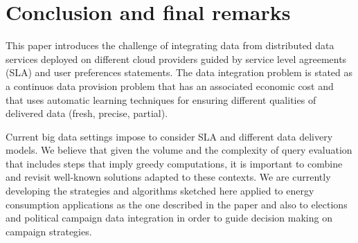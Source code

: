 \documentclass{llncs}
\begin{document}
\section{Conclusion and final remarks}\label{sec:conc}
This paper introduces the challenge of integrating data from distributed data services deployed on different cloud providers guided by service level agreements (SLA) and user preferences statements. The data integration problem is stated as a continuos data provision problem that has an associated economic cost and that uses automatic learning techniques for ensuring different qualities of delivered data (fresh, precise, partial).

Current big data settings impose to consider SLA and different data delivery models. We believe that given the volume and the complexity of query evaluation that includes steps that imply greedy computations, it is important to combine and revisit well-known solutions adapted to these contexts. We are currently developing the strategies and algorithms sketched here applied to energy consumption applications as the one described in the paper and also to elections and political campaign data integration in order to guide decision making on campaign strategies.


\end{document}
